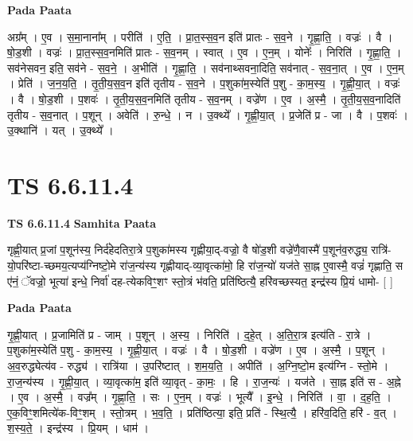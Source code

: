 \documentclass[17pt]{extarticle}
\begin{document}
\textbf{Pada Paata} \newline

अग्र᳚म् । ए॒व । स॒मा॒नाना᳚म् । परीति॑ । ए॒ति॒ । प्रा॒त॒स्स॒व॒न इति॑ प्रातः - स॒व॒ने । गृ॒ह्णा॒ति॒ । वज्रः॑ । वै । षो॒ड॒शी । वज्रः॑ । प्रा॒त॒स्स॒व॒नमिति॑ प्रातः - स॒व॒नम् । स्वात् । ए॒व । ए॒न॒म् । योनेः᳚ । निरिति॑ । गृ॒ह्णा॒ति॒ । सव॑नेसवन॒ इति॒ सव॑ने - स॒व॒ने॒ । अ॒भीति॑ । गृ॒ह्णा॒ति॒ । सव॑नाथ्सवना॒दिति॒ सव॑नात् - स॒व॒ना॒त् । ए॒व । ए॒न॒म् । प्रेति॑ । ज॒न॒य॒ति॒ । तृ॒ती॒य॒स॒व॒न इति॑ तृतीय - स॒व॒ने । प॒शुका॑म॒स्येति॑ प॒शु - का॒म॒स्य॒ । गृ॒ह्णी॒या॒त् । वज्रः॑ । वै । षो॒ड॒शी । प॒शवः॑ । तृ॒ती॒य॒स॒व॒नमिति॑ तृतीय - स॒व॒नम् । वज्रे॑ण । ए॒व । अ॒स्मै॒ । तृ॒ती॒य॒स॒व॒नादिति॑ तृतीय - स॒व॒नात् । प॒शून् । अवेति॑ । रु॒न्धे॒ । न । उ॒क्थ्ये᳚ । गृ॒ह्णी॒या॒त् । प्र॒जेति॑ प्र - जा । वै । प॒शवः॑ । उ॒क्थानि॑ । यत् । उ॒क्थ्ये᳚ ।  \newline





\section{ TS 6.6.11.4 }

\textbf{TS 6.6.11.4 } \newline
\textbf{Samhita Paata} \newline

गृह्णी॒यात् प्र॒जां प॒शून॑स्य॒ निर्द॑हेदतिरा॒त्रे प॒शुका॑मस्य गृह्णीया॒द्-वज्रो॒ वै षो॑ड॒शी वज्रे॑णै॒वास्मै॑ प॒शून॑व॒रुद्ध्य॒ रात्रि॑-यो॒परि॑ष्टा-च्छमय॒त्यप्य॑ग्निष्टो॒मे रा॑ज॒न्य॑स्य गृह्णीयाद्-व्या॒वृत्का॑मो॒ हि रा॑ज॒न्यो॑ यज॑ते सा॒ह्न ए॒वास्मै॒ वज्रं॑ गृह्णाति॒ स ए॑नं॒ ॅवज्रो॒ भूत्या॑ इन्धे॒ निर्वा॑ दह-त्येकविꣳ॒॒शꣳ स्तो॒त्रं भ॑वति॒ प्रति॑ष्ठित्यै॒ हरि॑वच्छस्यत॒ इन्द्र॑स्य प्रि॒यं धामो- [  ] \newline

\textbf{Pada Paata} \newline

गृ॒ह्णी॒यात् । प्र॒जामिति॑ प्र - जाम् । प॒शून् । अ॒स्य॒ । निरिति॑ । द॒हे॒त् । अ॒ति॒रा॒त्र इत्य॑ति - रा॒त्रे । प॒शुका॑म॒स्येति॑ प॒शु - का॒म॒स्य॒ । गृ॒ह्णी॒या॒त् । वज्रः॑ । वै । षो॒ड॒शी । वज्रे॑ण । ए॒व । अ॒स्मै॒ । प॒शून् । अ॒व॒रुद्ध्येत्य॑व - रुद्ध्य॑ । रात्रि॑या । उ॒परि॑ष्टात् । श॒म॒य॒ति॒ । अपीति॑ । अ॒ग्नि॒ष्टो॒म इत्य॑ग्नि - स्तो॒मे । रा॒ज॒न्य॑स्य । गृ॒ह्णी॒या॒त् । व्या॒वृत्का॑म॒ इति॑ व्या॒वृत् - का॒मः॒ । हि । रा॒ज॒न्यः॑ । यज॑ते । सा॒ह्न इति॑ स - अ॒ह्ने । ए॒व । अ॒स्मै॒ । वज्र᳚म् । गृ॒ह्णा॒ति॒ । सः । ए॒न॒म् । वज्रः॑ । भूत्यै᳚ । इ॒न्धे॒ । निरिति॑ । वा॒ । द॒ह॒ति॒ । ए॒क॒विꣳ॒॒शमित्ये॑क-विꣳ॒॒शम् । स्तो॒त्रम् । भ॒व॒ति॒ । प्रति॑ष्ठित्या॒ इति॒ प्रति॑ - स्थि॒त्यै॒ । हरि॑व॒दिति॒ हरि॑ - व॒त् । श॒स्य॒ते॒ । इन्द्र॑स्य । प्रि॒यम् । धाम॑ ।  \newline
\end{document}
